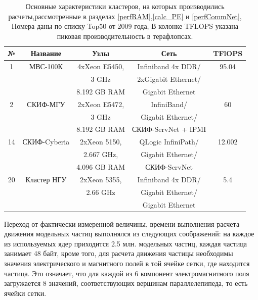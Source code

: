 \begin{table}[ht]
\caption{
Основные характеристики кластеров, на которых производились расчеты,рассмотренные в разделах \ref{perfRAM},\ref{calc_PE} и \ref{perfCommNet}, Номера даны по списку Top50 от 2009 года, В колонке TFLOPS указана пиковая производительность в терафлопсах.}
	\begin{center}
		\begin{tabular}{|c|c|c|c|c|}
			\hline
			№                 & Название & Узлы               & Сеть                                   &  TFlOPS\\
		          \hline 
			1                & МВС-100К & 4xXeon E5450,      &  Infiniband 4x DDR/                    & 95.04 \\
			&          & 3 GHz              &  2xGigabit Ethernet/                   &       \\
			&          & 8.192 GB RAM       &  Gigabit Ethernet                      &    \\ \hline 
			2                 & СКИФ-МГУ & 2xXeon E5472,      & InfiniBand/                             & 60   \\
			&          &   3 GHz            & Gigabit Ethernet/                       &      \\
			&          &  8.192 GB RAM      & СКИФ-ServNet + IPMI                    &   \\ \hline 
			14                & СКИФ-Cyberia & 2xXeon 5150,   &  QLogic InfiniPath/                     & 12.002 \\
			&              &  2.667 GHz,    & Gigabit Ethernet/                       &   \\
			&           &     4.096 GB RAM  & СКИФ-ServNet                            & \\ \hline 
			20                & Кластер НГУ & 2xXeon 5355,    &  Infiniband 4x DDR/                    & 5.4 \\ 
			&           & 2.66 GHz          &   Gigabit Ethernet/                    &  \\
			&           &                   &   Gigabit Ethernet                     &  \\ \hline 
			
		\end{tabular}
	\end{center}

	\label{top50_2010}
\end{table}

Переход от фактически измеренной величины, времени выполнения расчета движения модельных частиц выполнялся из следующих соображений: на каждое из используемых ядер приходится 2.5 млн. модельных частиц, каждая частица занимает 48 байт, кроме того, для расчета движения частицы необходимы значения электрического и магнитного полей в той ячейке сетки, где находится частица. Это означает, что для каждой из 6 компонент электромагнитного поля загружается 8 значений, соответствующих вершинам параллелепипеда, то есть ячейки сетки. 

